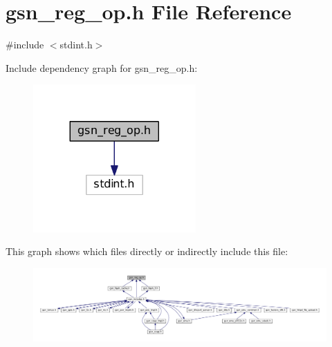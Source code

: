 \hypertarget{a00563}{
\section{gsn\_\-reg\_\-op.h File Reference}
\label{a00563}
}
{\ttfamily \#include $<$stdint.h$>$}\par
Include dependency graph for gsn\_\-reg\_\-op.h:
\nopagebreak
\begin{figure}[H]
\begin{center}
\leavevmode
\includegraphics[width=176pt]{a00799}
\end{center}
\end{figure}
This graph shows which files directly or indirectly include this file:
\nopagebreak
\begin{figure}[H]
\begin{center}
\leavevmode
\includegraphics[width=400pt]{a00800}
\end{center}
\end{figure}
